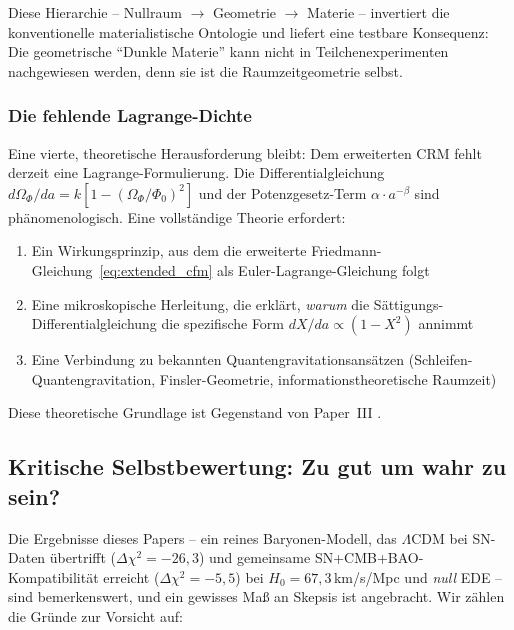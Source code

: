 \documentclass[aps,prd,twocolumn,superscriptaddress,nofootinbib,floatfix]{revtex4-2}
\begin{document}
Diese Hierarchie -- Nullraum $\to$ Geometrie $\to$ Materie -- invertiert die konventionelle materialistische Ontologie und liefert eine testbare Konsequenz: Die geometrische "`Dunkle Materie"' kann nicht in Teilchenexperimenten nachgewiesen werden, denn sie ist die Raumzeitgeometrie selbst.

\subsubsection{Die fehlende Lagrange-Dichte}

Eine vierte, theoretische Herausforderung bleibt: Dem erweiterten CRM fehlt derzeit eine Lagrange-Formulierung. Die Differentialgleichung $d\Omega_\Phi/da = k[1 - (\Omega_\Phi/\Phi_0)^2]$ und der Potenzgesetz-Term $\alpha \cdot a^{-\beta}$ sind phänomenologisch. Eine vollständige Theorie erfordert:
\begin{enumerate}
\item Ein Wirkungsprinzip, aus dem die erweiterte Friedmann-Gleichung~\eqref{eq:extended_cfm} als Euler-Lagrange-Gleichung folgt
\item Eine mikroskopische Herleitung, die erklärt, \textit{warum} die Sättigungs-Differentialgleichung die spezifische Form $dX/da \propto (1 - X^2)$ annimmt
\item Eine Verbindung zu bekannten Quantengravitationsansätzen (Schleifen-Quantengravitation, Finsler-Geometrie, informationstheoretische Raumzeit)
\end{enumerate}

Diese theoretische Grundlage ist Gegenstand von Paper~III \cite{Geiger2026c}.

\subsection{Kritische Selbstbewertung: Zu gut um wahr zu sein?}

Die Ergebnisse dieses Papers -- ein reines Baryonen-Modell, das $\Lambda$CDM bei SN-Daten übertrifft ($\Delta\chi^2 = -26{,}3$) und gemeinsame SN+CMB+BAO-Kompatibilität erreicht ($\Delta\chi^2 = -5{,}5$) bei $H_0 = 67{,}3$\,km/s/Mpc und \textit{null} EDE -- sind bemerkenswert, und ein gewisses Maß an Skepsis ist angebracht. Wir zählen die Gründe zur Vorsicht auf:
\end{document}
